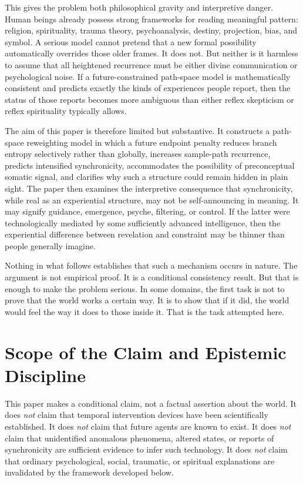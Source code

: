 \documentclass[12pt]{article}
\begin{document}
This gives the problem both philosophical gravity and interpretive danger. Human beings already possess strong frameworks for reading meaningful pattern: religion, spirituality, trauma theory, psychoanalysis, destiny, projection, bias, and symbol. A serious model cannot pretend that a new formal possibility automatically overrides those older frames. It does not. But neither is it harmless to assume that all heightened recurrence must be either divine communication or psychological noise. If a future-constrained path-space model is mathematically consistent and predicts exactly the kinds of experiences people report, then the status of those reports becomes more ambiguous than either reflex skepticism or reflex spirituality typically allows.

The aim of this paper is therefore limited but substantive. It constructs a path-space reweighting model in which a future endpoint penalty reduces branch entropy selectively rather than globally, increases sample-path recurrence, predicts intensified synchronicity, accommodates the possibility of preconceptual somatic signal, and clarifies why such a structure could remain hidden in plain sight. The paper then examines the interpretive consequence that synchronicity, while real as an experiential structure, may not be self-announcing in meaning. It may signify guidance, emergence, psyche, filtering, or control. If the latter were technologically mediated by some sufficiently advanced intelligence, then the experiential difference between revelation and constraint may be thinner than people generally imagine.

Nothing in what follows establishes that such a mechanism occurs in nature. The argument is not empirical proof. It is a conditional consistency result. But that is enough to make the problem serious. In some domains, the first task is not to prove that the world works a certain way. It is to show that if it did, the world would feel the way it does to those inside it. That is the task attempted here.

\section{Scope of the Claim and Epistemic Discipline}

This paper makes a conditional claim, not a factual assertion about the world. It does \emph{not} claim that temporal intervention devices have been scientifically established. It does \emph{not} claim that future agents are known to exist. It does \emph{not} claim that unidentified anomalous phenomena, altered states, or reports of synchronicity are sufficient evidence to infer such technology. It does \emph{not} claim that ordinary psychological, social, traumatic, or spiritual explanations are invalidated by the framework developed below.
\end{document}
